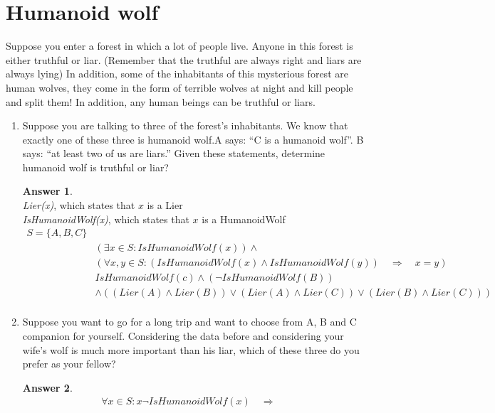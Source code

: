 \documentclass[a4paper]{article}
\renewcommand{\(}{\left(}
\renewcommand{\)}{\right)}
\theoremstyle{plain}
\theoremstyle{plain}
\theoremstyle{definition}
\newtheorem*{answer}{Answer}
\begin{document}
\section{Humanoid wolf}
Suppose you enter a forest in which a lot of people live. Anyone in this forest is either truthful or liar. (Remember that the truthful are always right and liars are always lying) In addition, some of the inhabitants of this mysterious forest are human wolves, they come in the form of terrible wolves at night and kill people and split them! In addition, any human beings can be truthful or liars.
\begin{enumerate}[label*=\alph*.,ref=\alph*]

\item Suppose you are talking to three of the forest's inhabitants. We know that exactly one of these three is humanoid wolf.A says:  ``C is a humanoid wolf''. B says: ``at least two of us are liars.'' Given these statements, determine humanoid wolf is truthful or liar?
\begin{shaded}
\begin{answer}
$$$$
\textit{Lier(x)}, which states that $x$ is a Lier \\
\textit{IsHumanoidWolf(x)}, which states that $x$ is a HumanoidWolf
\begin{align*}
S = \{ A , B , C \} \\
&(\exists x \in S : IsHumanoidWolf(x)) \wedge \\
&( \forall x , y \in S : (IsHumanoidWolf(x) \wedge IsHumanoidWolf(y)) \quad \Rightarrow \quad x = y) \\
&IsHumanoidWolf(c) \wedge ( \neg IsHumanoidWolf(B)) \\
&\wedge ((Lier(A) \wedge Lier(B)) \vee (Lier(A) \wedge Lier(C)) \vee (Lier(B) \wedge Lier(C))) \\
\end{align*}
\end{answer}
\end{shaded}

\item Suppose you want to go for a long trip and want to choose from A, B and C companion for yourself. Considering the data before and considering your wife's wolf is much more important than his liar, which of these three do you prefer as your fellow?
\begin{shaded}
\begin{answer}
\begin{align*}
\forall x \in S : x \neg IsHumanoidWolf(x) \quad \Rightarrow \quad
\end{align*}
\end{answer}
\end{shaded}


\end{enumerate}
\end{document}
